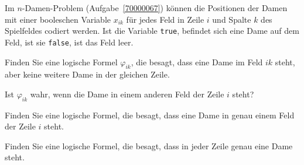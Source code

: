 Im $n$-Damen-Problem (Aufgabe~\ref{70000067}) können die Positionen
der Damen mit einer booleschen Variable $x_{ik}$ für jedes Feld 
in Zeile $i$ und Spalte $k$ des Spielfeldes codiert werden.
Ist die Variable \texttt{true}, befindet sich eine Dame auf dem
Feld, ist sie \texttt{false}, ist das Feld leer.
\begin{teilaufgaben}
\item
Finden Sie eine logische Formel $\varphi_{ik}$, die besagt, dass
eine Dame im Feld $ik$ steht, aber keine weitere Dame in der
gleichen Zeile.
\item
Ist $\varphi_{ik}$ wahr, wenn die Dame in einem anderen Feld der Zeile $i$
steht?
\item
Finden Sie eine logische Formel, die besagt, dass eine Dame in genau einem
Feld der Zeile $i$ steht.
\item
Finden Sie eine logische Formel, die besagt, dass in jeder Zeile genau
eine Dame steht.
\end{teilaufgaben}

